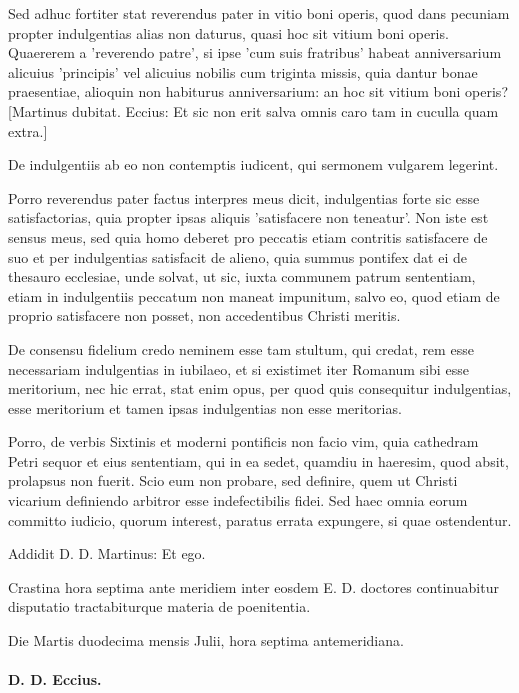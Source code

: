 Sed adhuc fortiter stat reverendus pater in vitio boni operis, quod dans pecuniam propter indulgentias alias non daturus, quasi hoc sit vitium boni operis. Quaererem a 'reverendo patre', si ipse 'cum suis fratribus' habeat anniversarium alicuius 'principis' vel alicuius nobilis cum triginta missis, quia dantur bonae praesentiae, alioquin non habiturus anniversarium: an hoc sit vitium boni operis? [Martinus dubitat. Eccius: Et sic non erit salva omnis caro tam in cuculla quam extra.]

De indulgentiis ab eo non contemptis iudicent, qui sermonem vulgarem legerint.

Porro reverendus pater factus interpres meus dicit, indulgentias forte sic esse satisfactorias, quia propter ipsas aliquis 'satisfacere non teneatur'. Non iste est sensus meus, sed quia homo deberet pro peccatis etiam contritis satisfacere de suo et per indulgentias satisfacit de alieno, quia summus pontifex dat ei de thesauro ecclesiae, unde solvat, ut sic, iuxta communem patrum sententiam, etiam in indulgentiis peccatum non maneat impunitum, salvo eo, quod etiam de proprio satisfacere non posset, non accedentibus Christi meritis.

De consensu fidelium credo neminem esse tam stultum, qui credat, rem esse necessariam indulgentias in iubilaeo, et si existimet iter Romanum sibi esse meritorium, nec hic errat, stat enim opus, per quod quis consequitur indulgentias, esse meritorium et tamen ipsas indulgentias non esse meritorias.

Porro, de verbis Sixtinis et moderni pontificis non facio vim, quia cathedram Petri sequor et eius sententiam, qui in ea sedet, quamdiu in haeresim, quod absit, prolapsus non fuerit. Scio eum non probare, sed definire, quem ut Christi vicarium definiendo arbitror esse indefectibilis fidei. Sed haec omnia eorum committo iudicio, quorum interest, paratus errata expungere, si quae ostendentur.

Addidit D. D. Martinus: Et ego.

\marginpar{\small[359]} Crastina hora septima ante meridiem inter eosdem E. D. doctores continuabitur disputatio tractabiturque materia de poenitentia.

Die Martis duodecima mensis Julii, hora septima antemeridiana.

\paragraph*{D. D. Eccius.}

